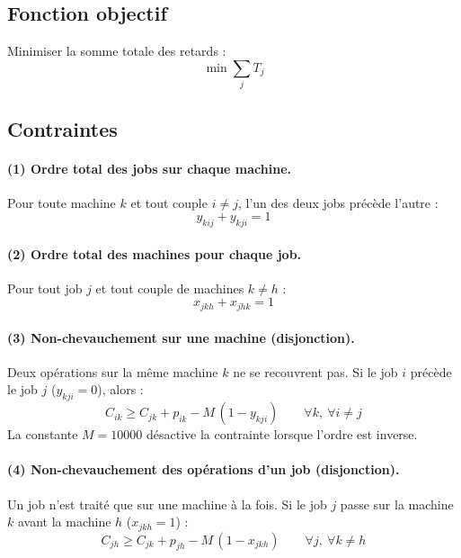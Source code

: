 \subsection{Fonction objectif}

Minimiser la somme totale des retards :
\begin{equation}
    \min \sum_{j} T_j
\end{equation}

\subsection{Contraintes}

\paragraph{(1) Ordre total des jobs sur chaque machine.} Pour toute machine $k$ et tout couple $i \neq j$, l'un des deux jobs précède l'autre :
\begin{equation}
    y_{kij} + y_{kji} = 1
\end{equation}

\paragraph{(2) Ordre total des machines pour chaque job.} Pour tout job $j$ et tout couple de machines $k \neq h$ :
\begin{equation}
    x_{jkh} + x_{jhk} = 1
\end{equation}

\paragraph{(3) Non-chevauchement sur une machine (disjonction).} Deux opérations sur la même machine $k$ ne se recouvrent pas. Si le job $i$ précède le job $j$ ($y_{kji}=0$), alors :
\begin{equation}
    C_{ik} \geq C_{jk} + p_{ik} - M\,(1 - y_{kji}) \qquad \forall k,\ \forall i \neq j
\end{equation}
La constante $M = 10000$ désactive la contrainte lorsque l'ordre est inverse.

\paragraph{(4) Non-chevauchement des opérations d'un job (disjonction).} Un job n'est traité que sur une machine à la fois. Si le job $j$ passe sur la machine $k$ avant la machine $h$ ($x_{jkh}=1$) :
\begin{equation}
    C_{jh} \geq C_{jk} + p_{jh} - M\,(1 - x_{jkh}) \qquad \forall j,\ \forall k \neq h
\end{equation}

